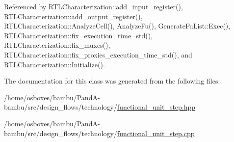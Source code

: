 Referenced by R\+T\+L\+Characterization\+::add\+\_\+input\+\_\+register(), R\+T\+L\+Characterization\+::add\+\_\+output\+\_\+register(), R\+T\+L\+Characterization\+::\+Analyze\+Cell(), Analyze\+Fu(), Generate\+Fu\+List\+::\+Exec(), R\+T\+L\+Characterization\+::fix\+\_\+execution\+\_\+time\+\_\+std(), R\+T\+L\+Characterization\+::fix\+\_\+muxes(), R\+T\+L\+Characterization\+::fix\+\_\+proxies\+\_\+execution\+\_\+time\+\_\+std(), and R\+T\+L\+Characterization\+::\+Initialize().



The documentation for this class was generated from the following files\+:\begin{DoxyCompactItemize}
\item 
/home/osboxes/bambu/\+Pand\+A-\/bambu/src/design\+\_\+flows/technology/\hyperlink{functional__unit__step_8hpp}{functional\+\_\+unit\+\_\+step.\+hpp}\item 
/home/osboxes/bambu/\+Pand\+A-\/bambu/src/design\+\_\+flows/technology/\hyperlink{functional__unit__step_8cpp}{functional\+\_\+unit\+\_\+step.\+cpp}\end{DoxyCompactItemize}
